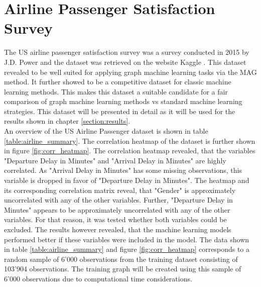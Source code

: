   \section{Airline Passenger Satisfaction Survey}
  
  The US airline passenger satisfaction survey was a survey conducted in 2015
  by J.D. Power and the dataset was retrieved on the website Kaggle
  \citep{JDPower2015,KAGGLE2015}. This dataset revealed to be well suited for
  applying graph machine learning tasks via the MAG method. It further showed
  to be a competitive dataset for classic machine learning methods. This makes
  this dataset a suitable candidate for a fair comparison of graph machine 
  learning methods vs standard machine learning strategies. This dataset will be
  presented in detail as it will be used for the results shown in chapter 
  \ref{section:results}. \\

  \noindent An overview of the US Airline Passenger dataset is shown in table
  \ref{table:airline_summary}. The correlation heatmap of the dataset is
  further shown in figure \ref{fig:corr_heatmap}. The correlation heatmap
  revealed, that the variables "Departure Delay in Minutes" and "Arrival Delay
  in Minutes" are highly correlated. As "Arrival Delay in Minutes" has some
  missing observations, this variable is dropped in favor of "Departure Delay 
  in Minutes". The heatmap and its corresponding correlation matrix reveal,
  that "Gender" is approximately uncorrelated with any of the other variables.
  Further, "Departure Delay in Minutes" appears to be approximately
  uncorrelated with any of the other variables. For that reason, it was tested
  whether both variables could be excluded. The results however revealed, that
  the machine learning models performed better if these variables were included 
  in the model. The data shown in table \ref{table:airline_summary} and 
  figure \ref{fig:corr_heatmap} corresponds to a random sample of 6’000 
  observations from the training dataset consisting of 103’904 observations.
  The training graph will be created using this sample of 6'000 observations due
  to computational time considerations. 

